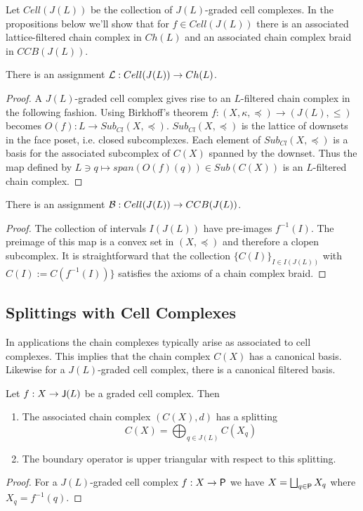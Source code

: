 Let $Cell(J(L))$ be the collection of $J(L)$-graded cell complexes.  In the propositions below we'll show that for $f\in Cell(J(L))$ there is an associated lattice-filtered chain complex in $Ch(L)$ and an associated chain complex braid in $CCB(J(L))$.


\begin{prop}
There is an assignment ${\mathcal L}:Cell(J(L))\to Ch(L)$.
\end{prop}
\begin{proof}
A $J(L)$-graded cell complex gives rise to an $L$-filtered chain complex in the following fashion.   Using Birkhoff's theorem $f:(X,\kappa,\preceq)\to (J(L),\leq)$ becomes $O(f):L\to Sub_{Cl}(X,\preceq)$.  $Sub_{Cl}(X,\preceq)$ is the lattice of downsets in the face poset, i.e. closed subcomplexes.  Each element of $Sub_{Cl}(X,\preceq)$ is a basis for the associated subcomplex of $C(X)$ spanned by the downset.   Thus the map defined by $L\ni q\mapsto span(O(f)(q))\in Sub(C(X))$ is an $L$-filtered chain complex. 
\end{proof}


\begin{prop}
There is an assignment ${\mathcal B}:Cell(J(L))\to CCB(J(L))$.
\end{prop}
\begin{proof}
The collection of intervals $I(J(L))$ have pre-images $f^{-1}(I)$.  The preimage of this map is a convex set in $(X,\preceq)$ and therefore a clopen subcomplex.   It is straightforward that the collection $\{C(I)\}_{I\in I(J(L))}$ with $C(I) := C(f^{-1}(I))\}$ satisfies the axioms of a chain complex braid. 
\end{proof}

\subsection{Splittings with Cell Complexes}


In applications the chain complexes typically arise as associated to cell complexes.  This implies that the chain complex $C(X)$ has a canonical basis.  Likewise for a $J(L)$-graded cell complex, there is a canonical filtered basis.

\begin{prop}
Let $f:X\to {\mathsf J}(L)$ be a graded cell complex.  Then 
\begin{enumerate}
\item The associated chain complex $(C(X),d)$ has a splitting $$C(X) = \bigoplus_{q\in J(L)} C(X_q)$$
\item The boundary operator is upper triangular with respect to this splitting.
\end{enumerate}
\end{prop}
\begin{proof}
For a $J(L)$-graded cell complex $f:X\to {\mathsf P}$ we have $X=\bigsqcup_{q\in {\mathsf P}} X_q$ where $X_q=f^{-1}(q)$.  
\end{proof}


